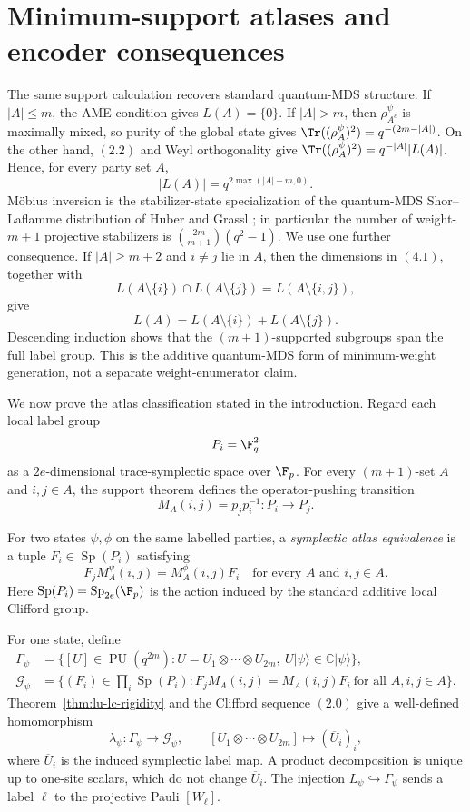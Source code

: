 \section{Minimum-support atlases and encoder consequences}
\label{sec:atlas}

The same support calculation recovers standard quantum-MDS structure.
If \(|A|\leq m\), the AME condition gives \(L(A)=\{0\}\).  If
\(|A|>m\), then \(\rho^\psi_{A^c}\) is maximally mixed, so purity of the
global state gives
\(\Tr((\rho^\psi_A)^2)=q^{-(2m-|A|)}\).  On the other hand, \((2.2)\)
and Weyl orthogonality give
\(\Tr((\rho^\psi_A)^2)=q^{-|A|}|L(A)|\).  Hence, for every party set
\(A\),
\[
 |L(A)|=q^{2\max(|A|-m,0)}.                              \tag{4.1}
\]
M\"obius inversion is the stabilizer-state specialization of the
quantum-MDS Shor--Laflamme distribution of Huber and Grassl
\cite[Theorems~8 and 9]{HuberGrassl2020}; in particular the number of
weight-\(m+1\) projective stabilizers is
\(\binom{2m}{m+1}(q^2-1)\).  We use one further consequence.  If
\(|A|\geq m+2\) and \(i\ne j\) lie in \(A\), then the dimensions in
\((4.1)\), together with
\[
 L(A\setminus\{i\})\cap L(A\setminus\{j\})
   =L(A\setminus\{i,j\}),
\]
give
\[
 L(A)=L(A\setminus\{i\})+L(A\setminus\{j\}).             \tag{4.2}
\]
Descending induction shows that the \((m+1)\)-supported subgroups span
the full label group.  This is the additive quantum-MDS form of
minimum-weight generation, not a separate weight-enumerator claim.

We now prove the atlas classification stated in the introduction.  Regard
each local label group
\[
 P_i=\F_q^2
\]
as a \(2e\)-dimensional trace-symplectic space over \(\F_p\).  For every
\((m+1)\)-set \(A\) and \(i,j\in A\), the support theorem defines the
operator-pushing transition
\[
 M_A(i,j)=p_jp_i^{-1}:P_i\longrightarrow P_j.
\]
\AMEFigureOne

For two states \(\psi,\phi\) on the same labelled parties, a
\emph{symplectic atlas equivalence} is a tuple
\(F_i\in\operatorname{Sp}(P_i)\) satisfying
\[
 F_jM_A^\psi(i,j)=M_A^\phi(i,j)F_i
 \quad\text{for every \(A\) and \(i,j\in A\)}.           \tag{4.3}
\]
Here
\(\operatorname{Sp}(P_i)=\operatorname{Sp}_{2e}(\F_p)\) is the action
induced by the standard
additive local Clifford group.

For one state, define
\[
\begin{split}
 \Gamma_\psi
  &=\{[U]\in\operatorname{PU}(q^{2m}):
       U=U_1\otimes\cdots\otimes U_{2m},\
       U\lvert\psi\rangle\in\mathbb C\lvert\psi\rangle\},\\
 \mathcal G_\psi
  &=\{(F_i)\in\prod_i\operatorname{Sp}(P_i):
       F_jM_A(i,j)=M_A(i,j)F_i\ \text{for all }A,i,j\in A\}.
\end{split}
\]
Theorem~\ref{thm:lu-lc-rigidity} and the Clifford sequence \((2.0)\)
give a well-defined homomorphism
\[
 \lambda_\psi:\Gamma_\psi\longrightarrow\mathcal G_\psi,\qquad
 [U_1\otimes\cdots\otimes U_{2m}]\longmapsto(\overline U_i)_i,
\]
where \(\overline U_i\) is the induced symplectic label map.  A product
decomposition is unique up to one-site scalars, which do not change
\(\overline U_i\).  The injection
\(L_\psi\hookrightarrow\Gamma_\psi\) sends a label
\(\ell\) to the projective Pauli \([W_\ell]\).

